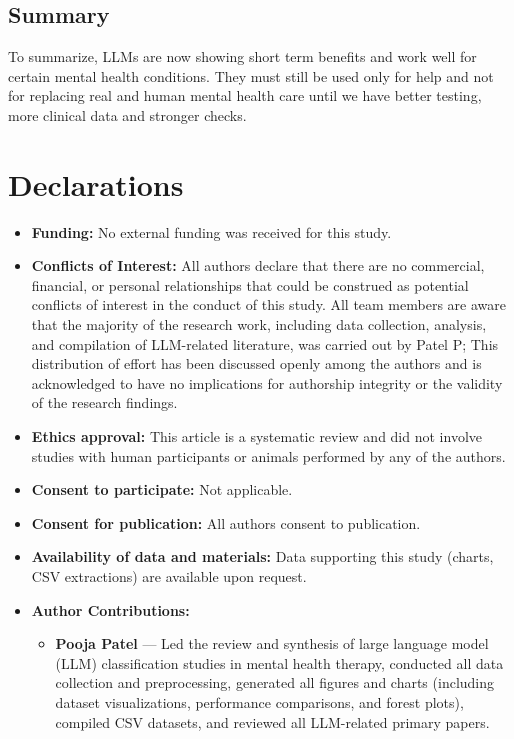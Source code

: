 \documentclass[sn-basic,authoryear]{sn-jnl}
\begin{document}
\subsection{Summary}
To summarize, LLMs are now showing short term benefits and work well for certain mental health conditions. They must still be used only for help and not for replacing real and human mental health care until we have better testing, more clinical data and stronger checks.



\section*{Declarations}
\begin{itemize}
    \item \textbf{Funding:} No external funding was received for this study.
    \item \textbf{Conflicts of Interest:} All authors declare that there are no commercial, financial, or personal relationships that could be construed as potential conflicts of interest in the conduct of this study. All team members are aware that the majority of the research work, including data collection, analysis, and compilation of LLM-related literature, was carried out by Patel P; This distribution of effort has been discussed openly among the authors and is acknowledged to have no implications for authorship integrity or the validity of the research findings.
    \item \textbf{Ethics approval:} This article is a systematic review and did not involve studies with human participants or animals performed by any of the authors.
    \item \textbf{Consent to participate:} Not applicable.
    \item \textbf{Consent for publication:} All authors consent to publication.
    \item \textbf{Availability of data and materials:} Data supporting this study (charts, CSV extractions) are available upon request.
    \item \textbf{Author Contributions:} \begin{itemize}
    \item \textbf{Pooja Patel} --- Led the review and synthesis of large language model (LLM) classification studies in mental health therapy, conducted all data collection and preprocessing, generated all figures and charts (including dataset visualizations, performance comparisons, and forest plots), compiled CSV datasets, and reviewed all LLM-related primary papers.
    

\end{itemize}
\end{itemize}
\end{document}
